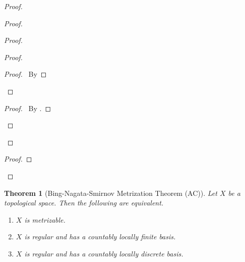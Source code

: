 \documentclass{report}
\let\qed\relax
\newtheorem{thm}[lm]{Theorem}
\theoremstyle{definition}
\begin{document}
\begin{proof}
\begin{proof}
\begin{proof}
\begin{proof}
        \qedstep
        \begin{proof}
          \pf\ By 
        \end{proof}
      \end{proof}
      \qedstep
      \begin{proof}
        \pf\ By .
      \end{proof}
    \end{proof}
  \end{proof}
  \begin{proof}
  \end{proof}
  \qed
\end{proof}

\begin{thm}[Bing-Nagata-Smirnov Metrization Theorem (AC)]
  Let $X$ be a topological space. Then the following are equivalent.
  \begin{enumerate}
    \item $X$ is metrizable.
    \item $X$ is regular and has a countably locally finite basis.
    \item $X$ is regular and has a countably locally discrete basis.
  \end{enumerate}
\end{thm}
\end{document}
